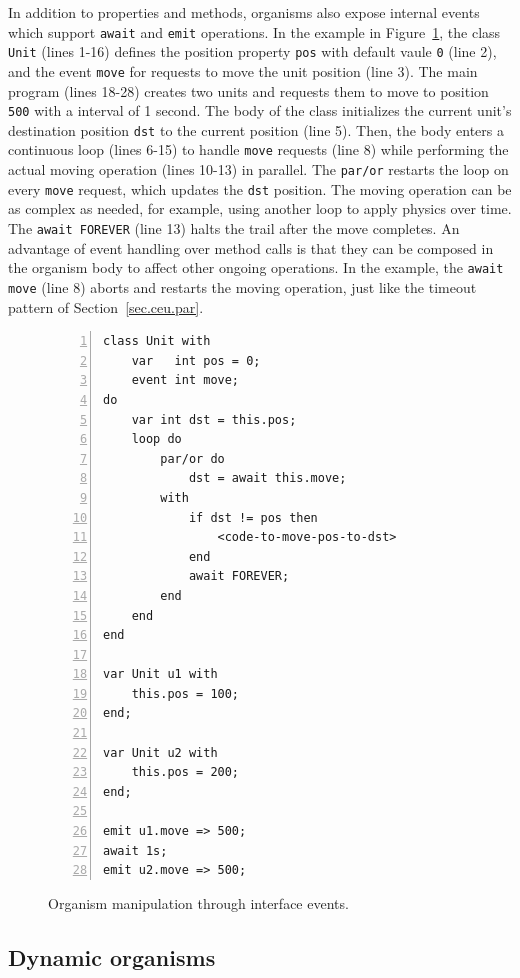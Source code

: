 \documentclass{acm_proc_article-sp}
\newcommand{\code}[1] {{\small{\texttt{#1}}}}
\newcommand{\1}{\;}
\newcommand{\2}{\;\;}
\newcommand{\3}{\;\;\;}
\newcommand{\5}{\;\;\;\;\;}
\begin{document}
In addition to properties and methods, organisms also expose internal events 
which support \code{await} and \code{emit} operations.
%
In the example in Figure~\ref{lst.unit}, the class \code{Unit} (lines 1-16) 
defines the position property \code{pos} with default vaule \code{0} (line 2), 
and the event \code{move} for requests to move the unit position (line 3).
%
The main program (lines 18-28) creates two units and requests them to move to 
position \code{500} with a interval of 1 second.
%
The body of the class initializes the current unit's destination position 
\code{dst} to the current position (line 5).
Then, the body enters a continuous loop (lines 6-15) to handle \code{move} 
requests (line 8) while performing the actual moving operation (lines 10-13) in 
parallel.
The \code{par/or} restarts the loop on every \code{move} request, which updates 
the \code{dst} position.
%
The moving operation can be as complex as needed, for example, using another 
loop to apply physics over time.
The \code{await FOREVER} (line 13) halts the trail after the move completes.
%
An advantage of event handling over method calls is that they can be composed 
in the organism body to affect other ongoing operations.
In the example, the \code{await move} (line 8) aborts and restarts the moving 
operation, just like the timeout pattern of Section~\ref{sec.ceu.par}.

\begin{figure}[t]
\begin{lstlisting}[numbers=left,xleftmargin=3em]
class Unit with
    var   int pos = 0;
    event int move;
do
    var int dst = this.pos;
    loop do
        par/or do
            dst = await this.move;
        with
            if dst != pos then
                <code-to-move-pos-to-dst>
            end
            await FOREVER;
        end
    end
end

var Unit u1 with
    this.pos = 100;
end;

var Unit u2 with
    this.pos = 200;
end;

emit u1.move => 500;
await 1s;
emit u2.move => 500;
\end{lstlisting}
\caption{ Organism manipulation through interface events.
\label{lst.unit}
}
\end{figure}

\subsection{Dynamic organisms}
\end{document}
